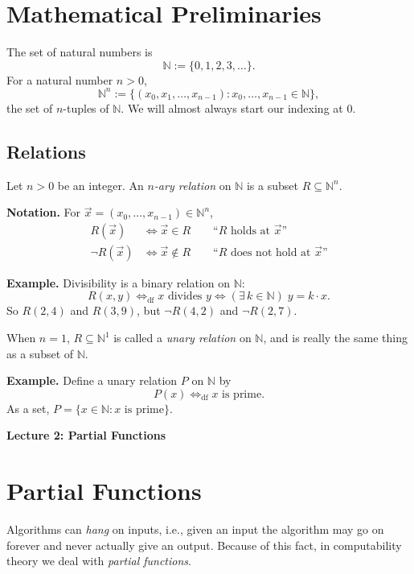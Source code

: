 \documentclass[11pt]{article}
\begin{document}
\section{Mathematical Preliminaries}

The set of natural numbers is
\[
    \mathbb{N} := \{0, 1, 2, 3, \dots\}.
\]
For a natural number $n > 0$,
\[
    \mathbb{N}^n := \{(x_0, x_1, \dots, x_{n-1}) : x_0, \dots, x_{n-1} \in \mathbb{N}\},
\]
the set of $n$-tuples of $\mathbb{N}$. We will almost always start our indexing at $0$.

\subsection{Relations}

Let $n > 0$ be an integer. An \emph{$n$-ary relation} on $\mathbb{N}$ is a subset $R \subseteq \mathbb{N}^n$.

\textbf{Notation.} For $\vec{x} = (x_0, \dots, x_{n-1}) \in \mathbb{N}^n$,
\begin{align*}
    R(\vec{x}) &\iff \vec{x} \in R \qquad \text{``$R$ holds at $\vec{x}$''} \\
    \neg R(\vec{x}) &\iff \vec{x} \notin R \qquad \text{``$R$ does not hold at $\vec{x}$''}
\end{align*}

\textbf{Example.} Divisibility is a binary relation on $\mathbb{N}$:
\[
    R(x, y) \iff_{\mathrm{df}} x \text{ divides } y \iff (\exists\, k \in \mathbb{N})\; y = k \cdot x.
\]
So $R(2,4)$ and $R(3,9)$, but $\neg R(4,2)$ and $\neg R(2,7)$.

When $n = 1$, $R \subseteq \mathbb{N}^1$ is called a \emph{unary relation} on $\mathbb{N}$, and is really the same thing as a subset of $\mathbb{N}$.

\textbf{Example.} Define a unary relation $P$ on $\mathbb{N}$ by
\[
    P(x) \iff_{\mathrm{df}} x \text{ is prime}.
\]
As a set, $P = \{x \in \mathbb{N} : x \text{ is prime}\}$.

\newpage

{\LARGE\bfseries Lecture 2: Partial Functions}

\section{Partial Functions}

Algorithms can \emph{hang} on inputs, i.e., given an input the algorithm may go on forever and never actually give an output. Because of this fact, in computability theory we deal with \emph{partial functions}.
\end{document}
